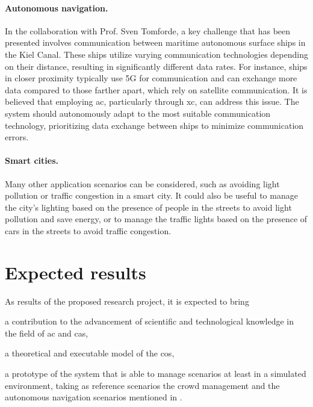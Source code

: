 \documentclass[12pt, a4paper]{article}
\newenvironment{inlinelist}{\begin{enumerate*}[label=\emph{(\roman*)}]}{\end{enumerate*}}
\begin{document}
\sloppypar
\paragraph{Autonomous navigation.}
In the collaboration with Prof. Sven Tomforde,
a key challenge that has been presented involves communication between maritime autonomous surface ships in the Kiel Canal.
%
These ships utilize varying communication technologies depending on their distance,
resulting in significantly different data rates.
%
For instance,
ships in closer proximity typically use 5G for communication and can exchange more data compared to those farther apart,
which rely on satellite communication.
%
It is believed that employing \ac{ac}, particularly through \ac{xc}, can address this issue.
%
The system should autonomously adapt to the most suitable communication technology,
prioritizing data exchange between ships to minimize communication errors.

\sloppypar
\paragraph{Smart cities.}
Many other application scenarios can be considered,
such as avoiding light pollution or traffic congestion in a smart city.
%
It could also be useful to manage the city's lighting based on the presence of people in the streets to avoid light pollution and save energy,
or to manage the traffic lights based on the presence of cars in the streets to avoid traffic congestion.

\section{Expected results}
\label{sec:expected-results}

As results of the proposed research project,
it is expected to bring
\begin{inlinelist}
    \item a contribution to the advancement of scientific and technological knowledge in the field of \ac{ac} and \ac{cas},
    \item a theoretical and executable model of the \ac{cos},
    \item a prototype of the system that is able to manage scenarios at least in a simulated environment,
    taking as reference scenarios the crowd management and the autonomous navigation scenarios mentioned in .
\end{inlinelist}
\end{document}
